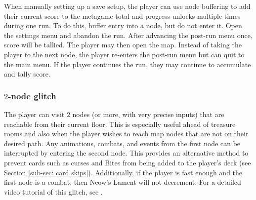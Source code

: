 \documentclass[12pt]{amsart}
\begin{document}
When manually setting up a save setup, the player can use node buffering to add their current score to the metagame total and progress unlocks multiple times during one run.  
To do this, buffer entry into a node, but do not enter it.  
Open the settings menu and abandon the run.  
After advancing the post-run menu once, score will be tallied.  
The player may then open the map.  
Instead of taking the player to the next node, the player re-enters the post-run menu but can quit to the main menu.  
If the player continues the run, they may continue to accumulate and tally score.  
\subsubsection{$2$-node glitch}\label{sub-sub-sec: 2-node}
The player can visit $2$ nodes (or more, with very precise inputs) that are reachable from their current floor.  
This is especially useful ahead of treasure rooms and also when the player wishes to reach map nodes that are not on their desired path.  
Any animations, combats, and events from the first node can be interrupted by entering the second node.  
This provides an alternative method to prevent cards such as curses and Bites from being added to the player's deck (see Section \ref{sub-sec: card skips}).  
Additionally, if the player is fast enough and the first node is a combat, then Neow's Lament will not decrement.  
For a detailed video tutorial of this glitch, see \cite{ForgottenArbiterMoreGlitches}.  
\\
\end{document}
